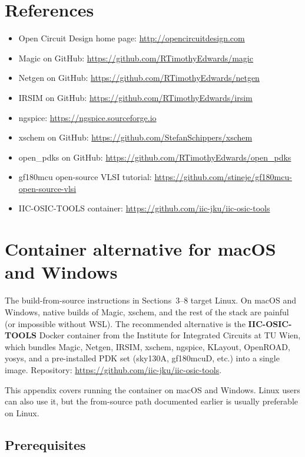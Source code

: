 \documentclass[11pt]{article}
\begin{document}
\section{References}

\begin{itemize}[leftmargin=2em]
  \item Open Circuit Design home page: \url{http://opencircuitdesign.com}
  \item Magic on GitHub: \url{https://github.com/RTimothyEdwards/magic}
  \item Netgen on GitHub: \url{https://github.com/RTimothyEdwards/netgen}
  \item IRSIM on GitHub: \url{https://github.com/RTimothyEdwards/irsim}
  \item ngspice: \url{https://ngspice.sourceforge.io}
  \item xschem on GitHub: \url{https://github.com/StefanSchippers/xschem}
  \item open\_pdks on GitHub: \url{https://github.com/RTimothyEdwards/open_pdks}
  \item gf180mcu open-source VLSI tutorial: \url{https://github.com/stineje/gf180mcu-open-source-vlsi}
  \item IIC-OSIC-TOOLS container: \url{https://github.com/iic-jku/iic-osic-tools}
\end{itemize}

\appendix

\section{Container alternative for macOS and Windows}
\label{app:container}

The build-from-source instructions in Sections~3--8 target Linux. On
macOS and Windows, native builds of Magic, xschem, and the rest of the
stack are painful (or impossible without WSL). The recommended
alternative is the \textbf{IIC-OSIC-TOOLS} Docker container from the
Institute for Integrated Circuits at TU Wien, which bundles Magic,
Netgen, IRSIM, xschem, ngspice, KLayout, OpenROAD, yosys, and a
pre-installed PDK set (sky130A, gf180mcuD, etc.) into a single image.
Repository: \url{https://github.com/iic-jku/iic-osic-tools}.

This appendix covers running the container on macOS and Windows. Linux
users can also use it, but the from-source path documented earlier is
usually preferable on Linux.

\subsection{Prerequisites}
\end{document}
